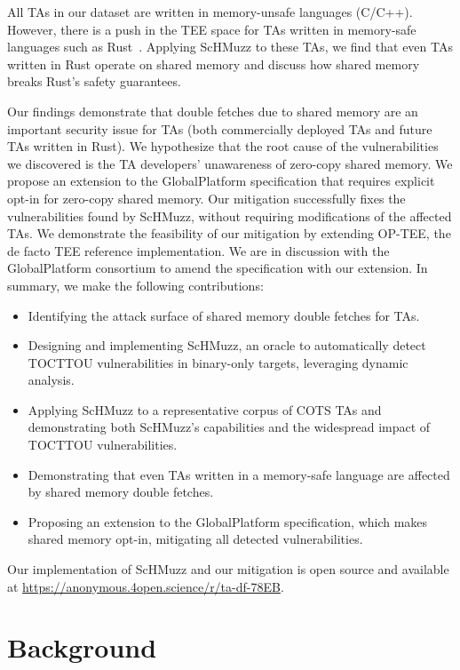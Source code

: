 \documentclass[letterpaper,twocolumn,10pt]{article}
\newcommand{\sysname}{ScHMuzz\xspace}
\newcommand{\optee}{OP-TEE\xspace}
\newcommand{\opensource}{\url{https://anonymous.4open.science/r/ta-df-78EB}\xspace}
\begin{document}
All TAs in our dataset are written in memory-unsafe languages (C/C++). 
However, there is a push in the TEE space for TAs written in memory-safe languages such as 
Rust~\cite{rustee,teaclave}. Applying \sysname to these TAs, we find that even TAs written 
in Rust operate on shared memory and discuss how shared memory breaks Rust's safety guarantees.

Our findings demonstrate that double fetches due to shared memory are an important 
security issue for TAs (both commercially deployed TAs and future TAs written in Rust). 
We hypothesize that the root cause of the vulnerabilities we discovered is the 
TA developers' unawareness of zero-copy shared memory. 
We propose an extension to the GlobalPlatform specification that requires explicit opt-in for 
zero-copy shared memory. Our mitigation successfully fixes the vulnerabilities found by \sysname, 
without requiring modifications of the affected TAs. We demonstrate the feasibility of our mitigation 
by extending \optee, the de facto TEE reference implementation. We are in discussion 
with the GlobalPlatform consortium to amend the specification with our extension.
In summary, we make the following contributions:

\begin{itemize}
    \item Identifying the attack surface of shared memory double fetches for TAs.
    \item Designing and implementing \sysname, an oracle to automatically detect TOCTTOU vulnerabilities 
    in binary-only targets, leveraging dynamic analysis.
    \item Applying \sysname to a representative corpus of COTS TAs and demonstrating both \sysname's capabilities 
    and the widespread impact of TOCTTOU vulnerabilities.
    \item Demonstrating that even TAs written in a memory-safe language are affected by shared memory 
    double fetches.
    \item Proposing an extension to the GlobalPlatform specification, which makes shared memory 
    opt-in, mitigating all detected vulnerabilities.
\end{itemize}

Our implementation of \sysname and our mitigation is open source and available at \opensource.

\section{Background}\label{sec:background}
\end{document}
